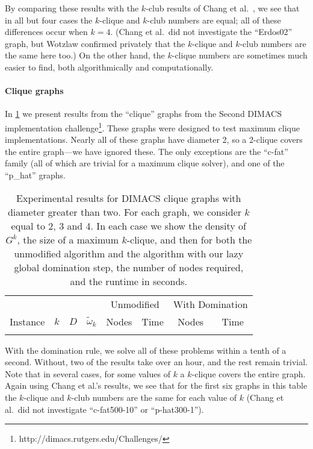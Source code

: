 \documentclass[letterpaper]{article}
\begin{document}
By comparing these results with the $k$-club results of Chang et al.\ , we see that
in all but four cases the $k$-clique and $k$-club numbers are equal; all of these differences occur
when $k = 4$. (Chang et al.\ did not investigate the ``Erdos02'' graph, but Wotzlaw
 confirmed privately that the $k$-clique and $k$-club numbers are the same here
too.) On the other hand, the $k$-clique numbers are sometimes much easier to find, both
algorithmically and computationally.

\paragraph{Clique graphs}

In \cref{table:clique} we present results from the ``clique'' graphs from the
Second DIMACS implementation challenge\footnote{http://dimacs.rutgers.edu/Challenges/}. These
graphs were designed to test maximum clique implementations. Nearly all of these graphs have
diameter 2, so a 2-clique covers the entire graph---we have ignored these. The only exceptions are
the ``c-fat'' family (all of which are trivial for a maximum clique solver), and one of the
``p\_hat'' graphs.

\begin{table}
    \tiny\setlength{\tabcolsep}{6pt} %
    \centering
    \begin{tabular}{l c rr rr rr}
        \toprule
        & & & & \multicolumn{2}{c}{Unmodified} & \multicolumn{2}{c}{With Domination} \\
    \cmidrule(lr){5-6}
    \cmidrule(lr){7-8}
    Instance & \multicolumn{1}{c}{$k$} & \multicolumn{1}{c}{$D$} & \multicolumn{1}{c}{$\tilde{\omega}_k$} &
    \multicolumn{1}{c}{Nodes} & \multicolumn{1}{c}{Time} &
    \multicolumn{1}{c}{Nodes} & \multicolumn{1}{c}{Time} \\
    \midrule
    {gen-table-dimacs}
    \bottomrule
\end{tabular}
\caption{Experimental results for DIMACS clique graphs with diameter greater
    than two. For each graph, we consider $k$ equal to 2, 3 and 4. In each case
    we show the density of $G^k$, the size of a maximum $k$-clique, and then
    for both the unmodified algorithm and the algorithm with our lazy global
domination step, the number of nodes required, and the runtime in seconds.}\label{table:clique}
\end{table}

With the domination rule, we solve all of these problems within a tenth of a second. Without, two of
the results take over an hour, and the rest remain trivial. Note that in several cases, for some
values of $k$ a $k$-clique covers the entire graph.  Again using Chang et al.'s results, we see that for the first six graphs in this table the $k$-clique and $k$-club
numbers are the same for each value of $k$ (Chang et al.\ did not investigate ``c-fat500-10'' or
``p-hat300-1'').
\end{document}
